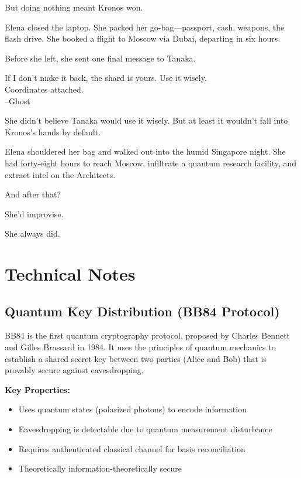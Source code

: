 \documentclass[12pt,oneside]{book}
\begin{document}
But doing nothing meant Kronos won.

Elena closed the laptop. She packed her go-bag—passport, cash, weapons, the flash drive. She booked a flight to Moscow via Dubai, departing in six hours.

Before she left, she sent one final message to Tanaka.

\begin{terminalbox}
If I don't make it back, the shard is yours. Use it wisely.\\
Coordinates attached.\\
--Ghost
\end{terminalbox}

She didn't believe Tanaka would use it wisely. But at least it wouldn't fall into Kronos's hands by default.

Elena shouldered her bag and walked out into the humid Singapore night. She had forty-eight hours to reach Moscow, infiltrate a quantum research facility, and extract intel on the Architects.

And after that?

She'd improvise.

She always did.

\newpage
\appendix
\chapter{Technical Notes}

\section*{Quantum Key Distribution (BB84 Protocol)}

BB84 is the first quantum cryptography protocol, proposed by Charles Bennett and Gilles Brassard in 1984. It uses the principles of quantum mechanics to establish a shared secret key between two parties (Alice and Bob) that is provably secure against eavesdropping.

\textbf{Key Properties:}
\begin{itemize}
\item Uses quantum states (polarized photons) to encode information
\item Eavesdropping is detectable due to quantum measurement disturbance
\item Requires authenticated classical channel for basis reconciliation
\item Theoretically information-theoretically secure
\end{itemize}
\end{document}

